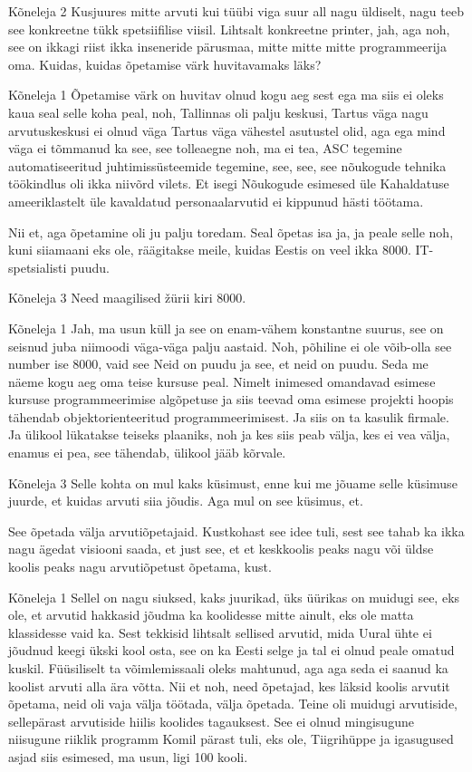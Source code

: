 Kõneleja 2
Kusjuures mitte arvuti kui tüübi viga suur all nagu üldiselt, nagu teeb see konkreetne tükk spetsiifilise viisil. Lihtsalt konkreetne printer, jah, aga noh, see on ikkagi riist ikka inseneride pärusmaa, mitte mitte mitte programmeerija oma. Kuidas, kuidas õpetamise värk huvitavamaks läks? 

Kõneleja 1
Õpetamise värk on huvitav olnud kogu aeg sest ega ma siis ei oleks kaua seal selle koha peal, noh, Tallinnas oli palju keskusi, Tartus väga nagu arvutuskeskusi ei olnud väga Tartus väga vähestel asutustel olid, aga ega mind väga ei tõmmanud ka see, see tolleaegne noh, ma ei tea, ASC tegemine automatiseeritud juhtimissüsteemide tegemine, see, see, see nõukogude tehnika töökindlus oli ikka niivõrd vilets. Et isegi Nõukogude esimesed üle Kahaldatuse ameeriklastelt üle kavaldatud personaalarvutid ei kippunud hästi töötama. 

Nii et, aga õpetamine oli ju palju toredam. Seal õpetas isa ja, ja peale selle noh, kuni siiamaani eks ole, räägitakse meile, kuidas Eestis on veel ikka 8000. IT-spetsialisti puudu. 

Kõneleja 3
Need maagilised žürii kiri 8000. 

Kõneleja 1
Jah, ma usun küll ja see on enam-vähem konstantne suurus, see on seisnud juba niimoodi väga-väga palju aastaid. Noh, põhiline ei ole võib-olla see number ise 8000, vaid see Neid on puudu ja see, et neid on puudu. Seda me näeme kogu aeg oma teise kursuse peal. Nimelt inimesed omandavad esimese kursuse programmeerimise algõpetuse ja siis teevad oma esimese projekti hoopis tähendab objektorienteeritud programmeerimisest. Ja siis on ta kasulik firmale. Ja ülikool lükatakse teiseks plaaniks, noh ja kes siis peab välja, kes ei vea välja, enamus ei pea, see tähendab, ülikool jääb kõrvale. 

Kõneleja 3
Selle kohta on mul kaks küsimust, enne kui me jõuame selle küsimuse juurde, et kuidas arvuti siia jõudis. Aga mul on see küsimus, et. 

See õpetada välja arvutiõpetajaid. Kustkohast see idee tuli, sest see tahab ka ikka nagu ägedat visiooni saada, et just see, et et keskkoolis peaks nagu või üldse koolis peaks nagu arvutiõpetust õpetama, kust. 

Kõneleja 1
Sellel on nagu siuksed, kaks juurikad, üks üürikas on muidugi see, eks ole, et arvutid hakkasid jõudma ka koolidesse mitte ainult, eks ole matta klassidesse vaid ka. Sest tekkisid lihtsalt sellised arvutid, mida Uural ühte ei jõudnud keegi ükski kool osta, see on ka Eesti selge ja tal ei olnud peale omatud kuskil. Füüsiliselt ta võimlemissaali oleks mahtunud, aga aga seda ei saanud ka koolist arvuti alla ära võtta. Nii et noh, need õpetajad, kes läksid koolis arvutit õpetama, neid oli vaja välja töötada, välja õpetada. Teine oli muidugi arvutiside, sellepärast arvutiside hiilis koolides tagauksest. See ei olnud mingisugune niisugune riiklik programm Komil pärast tuli, eks ole, Tiigrihüppe ja igasugused asjad siis esimesed, ma usun, ligi 100 kooli. 

